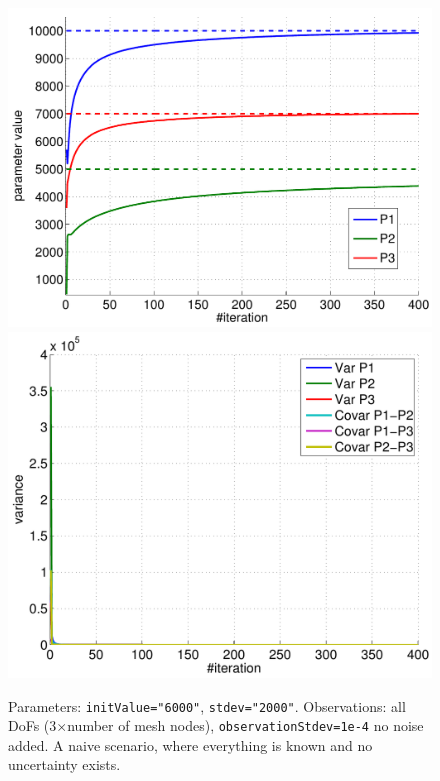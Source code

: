 \documentclass[10pt]{article}
\begin{document}
\begin{figure}[ht]
\begin{center}
\includegraphics[width=.49\linewidth]{figures/p1_estim.pdf}
\hfill
\includegraphics[width=.49\linewidth]{figures/p1_var.pdf}
\caption{Parameters: \texttt{initValue="6000"}, \texttt{stdev="2000"}. Observations: all DoFs (3$\times$number of mesh nodes),
\texttt{observationStdev=1e-4} no noise added. A naive scenario, where everything is known and no uncertainty exists.}
\label{fig:Results1}
\end{center}
\end{figure}
\end{document}
